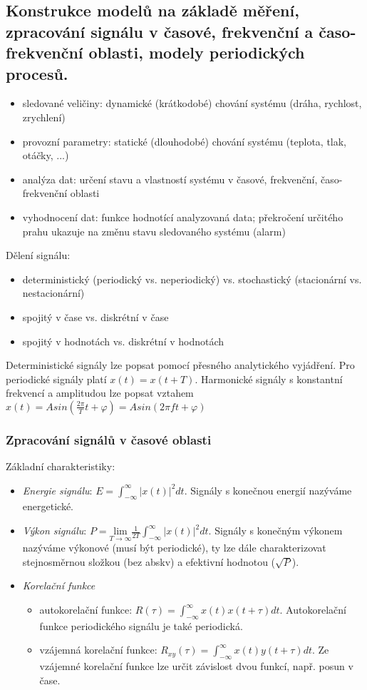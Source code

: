 \subsection{Konstrukce modelů na základě měření, zpracování signálu v časové, frekvenční a časo-frekvenční oblasti, modely periodických procesů.}
\vspace{2.5cm}
\begin{itemize}
\item sledované veličiny: dynamické (krátkodobé) chování systému (dráha, rychlost, zrychlení)
\item provozní parametry: statické (dlouhodobé) chování systému (teplota, tlak, otáčky, ...)
\item analýza dat: určení stavu a vlastností systému v časové, frekvenční, časo-frekvenční oblasti
\item vyhodnocení dat: funkce hodnotící analyzovaná data; překročení určitého prahu ukazuje na změnu stavu sledovaného systému (alarm)
\end{itemize}
Dělení signálu: 
\begin{itemize}
\item deterministický (periodický vs. neperiodický) vs. stochastický (stacionární vs. nestacionární)
\item spojitý v čase vs. diskrétní v čase
\item spojitý v hodnotách vs. diskrétní v hodnotách
\end{itemize}
Deterministické signály lze popsat pomocí přesného analytického vyjádření. Pro periodické signály platí $ x(t) = x(t+T) $. Harmonické signály s konstantní frekvencí a amplitudou lze popsat vztahem $ x(t) = A sin \left( \frac{2 \pi}{T} t + \varphi \right) = A sin (2\pi f t + \varphi) $

\subsubsection*{Zpracování signálů v časové oblasti}
Základní charakteristiky:
\begin{itemize}
\item \textit{Energie signálu}: $ E = \displaystyle{\int_{-\infty}^\infty} |x(t)|^2 dt $. Signály s konečnou energií nazýváme energetické.
\item \textit{Výkon signálu}: $ P = \underset{T \to \infty}{\mathrm{lim}} \frac{1}{2T} \displaystyle{\int_{-\infty}^\infty} |x(t)|^2 dt $. Signály s konečným výkonem nazýváme výkonové (musí být periodické), ty lze dále charakterizovat stejnosměrnou složkou (bez abskv) a efektivní hodnotou ($ \sqrt{P} $).
\item \textit{Korelační funkce}
\begin{itemize}
\item autokorelační funkce: $ R(\tau) = \displaystyle{\int_{-\infty}^\infty} x(t) x(t+\tau) dt $. Autokorelační funkce periodického signálu je také periodická.
\item vzájemná korelační funkce: $ R_{xy}(\tau) = \displaystyle{\int_{-\infty}^\infty} x(t) y(t+\tau) dt $.  Ze vzájemné korelační funkce lze určit závislost dvou funkcí, např. posun v čase.
\end{itemize}
\end{itemize}

